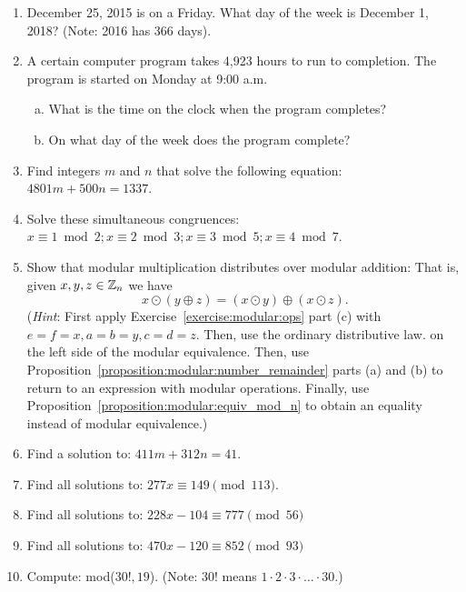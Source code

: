 \begin{enumerate}

\item
December 25, 2015 is on a Friday.  What day of the week is December 1, 2018?  (Note: 2016 has 366 days).

\item
A certain computer program takes 4,923 hours to run to completion. The program is started on Monday at 9:00 a.m.
\begin{enumerate}[(a)]
\item
What is the time on the clock when the program completes?
\item
On what day of the week does the program complete?
\end{enumerate}



\item
Find integers $m$ and $n$ that solve the following equation: $4801m + 500n = 1337$.

\item
Solve these simultaneous congruences: $x \equiv 1 \bmod{2}; x \equiv 2 \bmod{3}; x \equiv 3 \bmod{5}; x\equiv4 \bmod{7}$.


\item
Show that  modular multiplication distributes over modular addition: That is, given $x,y,z \in \mathbb{Z}_n$ we have
\[
x \odot (y \oplus z) = (x \odot y) \oplus  (x \odot z).
\]
(\emph{Hint}:  First apply Exercise~\ref{exercise:modular:ops} part (c)  with $e=f=x, a=b=y, c=d=z$. Then, use the ordinary distributive law. on the left side of the modular equivalence.  Then, use  Proposition~\ref{proposition:modular:number_remainder} parts (a) and (b) to return to an expression with modular operations.  Finally, use Proposition~\ref{proposition:modular:equiv_mod_n} to obtain an equality instead of modular equivalence.)

\item
 Find a solution to:  $411m + 312n = 41 $.

\item
Find all solutions to: $277x \equiv 149 \pmod{113}$.

\item
Find all solutions to:  $228 x - 104 \equiv 777 \pmod{56}$


\item
Find all solutions to:  $ 470x - 120 \equiv 852 \pmod{93}$

\item
Compute:  mod($30!,19$).  (Note: $30!$ means $1 \cdot 2 \cdot 3 \cdot \ldots \cdot 30$.)


\end{enumerate}
